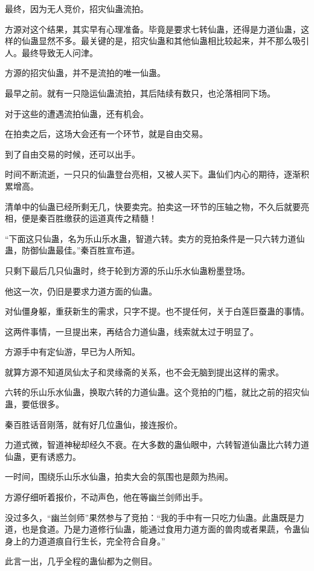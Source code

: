 \begin{this_body}
最终，因为无人竞价，招灾仙蛊流拍。

方源对这个结果，其实早有心理准备。毕竟是要求七转仙蛊，还得是力道仙蛊，这样的仙蛊显然不多。最关键的是，招灾仙蛊和其他仙蛊相比较起来，并不那么吸引人。最终导致无人问津。

方源的招灾仙蛊，并不是流拍的唯一仙蛊。

最早之前。就有一只隐运仙蛊流拍，其后陆续有数只，也沦落相同下场。

对于这些的遭遇流拍仙蛊，还有机会。

在拍卖之后，这场大会还有一个环节，就是自由交易。

到了自由交易的时候，还可以出手。

时间不断流逝，一只只的仙蛊登台亮相，又被人买下。蛊仙们内心的期待，逐渐积累增高。

清单中的仙蛊已经所剩无几，快要卖完。拍卖这一环节的压轴之物，不久后就要亮相，便是秦百胜缴获的运道真传之精髓！

“下面这只仙蛊，名为乐山乐水蛊，智道六转。卖方的竞拍条件是一只六转力道仙蛊，防御仙蛊最佳。”秦百胜宣布道。

只剩下最后几只仙蛊时，终于轮到方源的乐山乐水仙蛊粉墨登场。

他这一次，仍旧是要求力道方面的仙蛊。

对仙僵身躯，重获新生的需求，只字不提。也不提任何，关于白莲巨蚕蛊的事情。

这两件事情，一旦提出来，再结合力道仙蛊，线索就太过于明显了。

方源手中有定仙游，早已为人所知。

就算方源不知道凤仙太子和灵缘斋的关系，也不会无脑到提出这样的需求。

六转的乐山乐水仙蛊，换取六转的力道仙蛊。这个竞拍的门槛，就比之前的招灾仙蛊，要低很多。

秦百胜话音刚落，就有好几位蛊仙，接连报价。

力道式微，智道神秘却经久不衰。在大多数的蛊仙眼中，六转智道仙蛊比六转力道仙蛊，更有诱惑力。

一时间，围绕乐山乐水仙蛊，拍卖大会的氛围也是颇为热闹。

方源仔细听着报价，不动声色，他在等幽兰剑师出手。

没过多久，“幽兰剑师”果然参与了竞拍：“我的手中有一只吃力仙蛊。此蛊既是力道，也是食道。乃是力道修行仙蛊，能通过食用力道方面的兽肉或者果蔬，令蛊仙身上的力道道痕自行生长，完全符合自身。”

此言一出，几乎全程的蛊仙都为之侧目。


\end{this_body}
